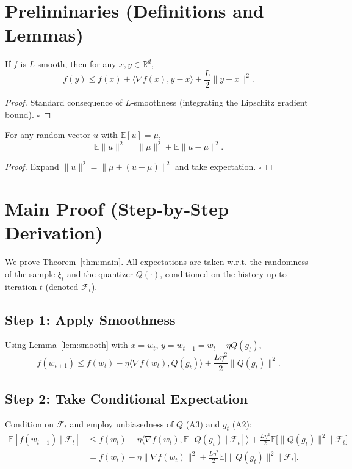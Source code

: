 \documentclass{article}
\begin{document}
\newpage
\section*{Preliminaries (Definitions and Lemmas)}
\begin{lemma}\label{lem:smooth}
If $f$ is $L$‑smooth, then for any $x,y\in\mathbb{R}^d$,
\[
f(y) \le f(x) + \langle\nabla f(x),y-x\rangle + \frac{L}{2}\|y-x\|^2 .
\]
\end{lemma}
\begin{proof}
Standard consequence of $L$‑smoothness (integrating the Lipschitz gradient bound). \hfill $\square$
\end{proof}

\begin{lemma}\label{lem:var}
For any random vector $u$ with $\mathbb{E}[u]=\mu$,
\[
\mathbb{E}\|u\|^2 = \|\mu\|^2 + \mathbb{E}\|u-\mu\|^2 .
\]
\end{lemma}
\begin{proof}
Expand $\|u\|^2=\|\mu+(u-\mu)\|^2$ and take expectation. \hfill $\square$
\end{proof}

\section*{Main Proof (Step‑by‑Step Derivation)}
We prove Theorem~\ref{thm:main}. All expectations are taken w.r.t. the randomness of the sample $\xi_t$ and the quantizer $Q(\cdot)$, conditioned on the history up to iteration $t$ (denoted $\mathcal{F}_t$).

\subsection*{Step 1: Apply Smoothness}
Using Lemma~\ref{lem:smooth} with $x=w_t$, $y=w_{t+1}=w_t-\eta Q(g_t)$,
\[
f(w_{t+1}) \le f(w_t) -\eta\langle\nabla f(w_t), Q(g_t)\rangle + \frac{L\eta^2}{2}\|Q(g_t)\|^2 .
\tag{2}
\]

\subsection*{Step 2: Take Conditional Expectation}
Condition on $\mathcal{F}_t$ and employ unbiasedness of $Q$ (A3) and $g_t$ (A2):
\[
\begin{aligned}
\mathbb{E}[f(w_{t+1})\mid\mathcal{F}_t] 
&\le f(w_t) -\eta\langle\nabla f(w_t), \mathbb{E}[Q(g_t)\mid\mathcal{F}_t]\rangle
     + \frac{L\eta^2}{2}\mathbb{E}\!\big[\|Q(g_t)\|^2\mid\mathcal{F}_t\big] \\[4pt]
&= f(w_t) -\eta\|\nabla f(w_t)\|^2
     + \frac{L\eta^2}{2}\mathbb{E}\!\big[\|Q(g_t)\|^2\mid\mathcal{F}_t\big] .
\end{aligned}
\tag{3}
\]
\end{document}
